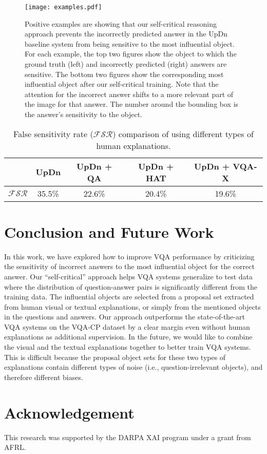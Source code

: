 \documentclass{article}
\begin{document}
\begin{figure}[!t]
    \centering
    \texttt{[image: examples.pdf]}
    \caption{Positive examples are showing that our self-critical reasoning approach prevents the incorrectly predicted answer in the UpDn baseline system from being sensitive to the most influential object. For each example, the top two figures show the object to which the ground truth (left) and incorrectly predicted (right) answers are sensitive. The bottom two figures show the corresponding most influential object after our self-critical training. Note that the attention for the incorrect answer shifts to a more relevant part of the image for that answer. The number around the bounding box is the answer's sensitivity to the object.}
    \label{fig:examples}
\end{figure}
\begin{table}[h]
\centering
\begin{tabular}{l|c|c|c|c}
\hline \toprule
                  & UpDn  & UpDn + QA& UpDn + HAT & UpDn + VQA-X \\  \hline
$\mathcal{FSR}$     & 35.5\%&22.6\%  & 20.4\% & 19.6\%  \\ \bottomrule
\end{tabular}
\caption{False sensitivity rate ($\mathcal{FSR}$) comparison of using different types of human explanations.}
\label{tab:false_sensitivity_rate}
\end{table}

\section{Conclusion and Future Work}
In this work, we have explored how to improve VQA performance by criticizing the sensitivity of incorrect answers to the most influential object for the correct answer. Our ``self-critical'' approach helps VQA systems generalize to test data where the distribution of question-answer pairs is significantly different from the training data. The influential objects are selected from a proposal set extracted from human visual or textual explanations, or simply from the mentioned objects in the questions and answers. Our approach outperforms the state-of-the-art VQA systems on the VQA-CP dataset by a clear margin even without human explanations as additional supervision. In the future, we would like to combine the visual and the textual explanations together to better train VQA systems. This is difficult because the proposal object sets for these two types of explanations contain different types of noise (i.e., question-irrelevant objects), and therefore different biases.

\section*{Acknowledgement}
This research was supported by the DARPA XAI program under a grant from AFRL. 


\end{document}
